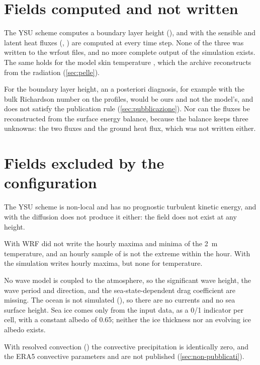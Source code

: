 \section{Fields computed and not written}
\label{sec:non-scritti}

The YSU scheme computes a boundary layer height (), and with  the sensible
and latent heat fluxes (, ) are computed at every time step. None of the three
was written to the wrfout files, and no more complete output of the simulation exists. The same
holds for the model skin temperature , which the archive reconstructs from the radiation
(\cref{sec:pelle}).

For the boundary layer height, an a posteriori diagnosis, for example with the bulk Richardson number
on the profiles, would be ours and not the model's, and does not satisfy the publication rule
(\cref{sec:pubblicazione}). Nor can the fluxes be reconstructed from the surface energy balance,
because the balance keeps three unknowns: the two fluxes and the ground heat flux, which was not
written either.

\section{Fields excluded by the configuration}
\label{sec:configurazione-limiti}

The YSU scheme is non-local and has no prognostic turbulent kinetic energy, and with  the
diffusion does not produce it either: the field does not exist at any height.

With  WRF did not write the hourly maxima and minima of the \SI{2}{m}
temperature, and an hourly sample of  is not the extreme within the hour. With
 the simulation writes hourly maxima, but none for temperature.

No wave model is coupled to the atmosphere, so the significant wave height, the wave period and
direction, and the sea-state-dependent drag coefficient are missing. The ocean is not simulated
(), so there are no currents and no sea surface height. Sea ice comes only
from the input data, as a 0/1 indicator per cell, with a constant albedo of \num{0.65}; neither
the ice thickness nor an evolving ice albedo exists.

With resolved convection () the convective precipitation  is
identically zero, and the ERA5 convective parameters  and  are not published
(\cref{sec:non-pubblicati}).

